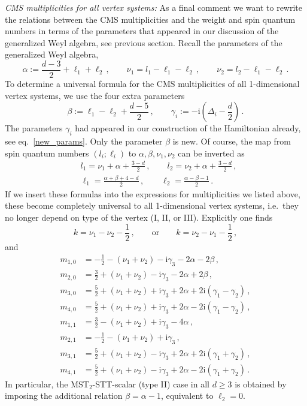 \documentclass{article}
\def \Dg {\Delta}
\def \ag {\alpha}
\def \bg {\beta}
\def \cg {\gamma}
\begin{document}
\noindent 
\textit{CMS multiplicities for all vertex systems:} As a final comment we want to rewrite the
relations between the CMS multiplicities and the weight and spin quantum numbers in terms of 
the parameters that appeared in our discussion of the generalized Weyl algebra, see previous 
section. Recall the parameters of the generalized Weyl algebra,
\begin{equation}
    \ag := \frac{d-3}{2}+\ell_1+\ell_2\,, \qquad \nu_{1} = l_1-\ell_1-\ell_2\,, \qquad \nu_2 = l_2-\ell_1-\ell_2\,.
\end{equation}
To determine a universal formula for the CMS multiplicities of all 1-dimensional vertex 
systems, we use the four extra parameters
\begin{equation}
    \bg := \ell_1-\ell_2+\frac{d-5}{2}\,, \qquad \cg_i := -\mathrm{i}\left(\Dg_i- \frac{d}{2}\right)\,. 
\end{equation}
The parameters $\gamma_i$ had appeared in our construction of the Hamiltonian already, see
eq.\ \eqref{new_params}. Only the parameter $\beta$ is new. Of course, the map from spin quantum 
numbers $(l_i;\ell_i)$ to $\ag,\bg,\nu_1,\nu_2$ can be inverted as
\begin{align}
   & l_1 = \nu_1+\ag+\frac{3-d}{2}\,, \qquad  l_2 = \nu_2+\ag+\frac{3-d}{2}\,, \\
    &\ell_1 = \frac{\ag+\bg+4-d}{2}\,,\qquad \ell_2 = \frac{\ag-\bg-1}{2}\,.
\end{align}
If we insert these formulas into the expressions for multiplicities we listed above, 
these become completely universal to all 1-dimensional vertex systems, i.e.\ they no longer depend on type of the 
vertex (I, II, or III). Explicitly one finds 
\begin{equation}
    k = \nu_1-\nu_2-\frac{1}{2}\,, \qquad \mathrm{or} \qquad k= \nu_2-\nu_1-\frac{1}{2}\,, 
\end{equation}
and
\begin{align}
    m_{1,0} &= -\frac{1}{2}-(\nu_1+\nu_2)-\mathrm{i}\cg_3 -2\ag -2\bg\,,  \\
    m_{2,0}&= \frac{3}{2} +(\nu_1+\nu_2) -\mathrm{i}\cg_3-2\ag+2\bg\,, \\
    m_{3,0} &= \frac{5}{2} +(\nu_1+\nu_2) + \mathrm{i} \cg_3 +2\ag+ 2\mathrm{i}(\cg_1-\cg_2)\,, \\
    m_{4,0}&= \frac{5}{2} +(\nu_1+\nu_2) + \mathrm{i}\cg_3+2\ag -2\mathrm{i}(\cg_1-\cg_2)\,, \\
    m_{1,1} &= \frac{3}{2} -(\nu_1+\nu_2) + \mathrm{i} \cg_3-4\ag\,, \\
    m_{2,1} &= -\frac{1}{2} -(\nu_1+\nu_2) + \mathrm{i}\cg_3\,, \\
    m_{3,1} &= \frac{5}{2} +(\nu_1+\nu_2) -\mathrm{i}\cg_3 + 2\ag + 2\mathrm{i}(\cg_1+\cg_2)\,, \\
    m_{4,1} &= \frac{5}{2} +(\nu_1+\nu_2) -\mathrm{i}\cg_3+2\ag -2\mathrm{i}(\cg_1+\cg_2)\,.
\end{align}
In particular, the MST$_2$-STT-scalar (type II) case in all $d\geq 3$ is obtained by 
imposing the additional relation $\bg = \ag - 1$, equivalent to $\ell_2=0$.
\end{document}
